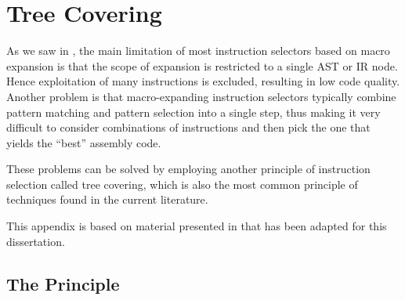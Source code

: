 %

\chapter{Tree Covering}


As we saw in , the main limitation of most
\glspl{instruction selector} based on \gls{macro expansion} is that the scope of
expansion is restricted to a single \gls{AST} or \gls{IR} \gls{node}.
%
Hence exploitation of
many \glspl{instruction} is excluded, resulting in low code quality.
%
Another
problem is that \gls{macro}-expanding \glspl{instruction selector} typically
combine \gls{pattern matching} and \gls{pattern selection} into a single step,
thus making it very difficult to consider combinations of \glspl{instruction}
and then pick the one that yields the ``best'' \gls{assembly code}.

These problems can be solved by employing another \gls{principle} of
\gls{instruction selection} called \gls{tree covering}, which is also the most
common \gls{principle} of techniques found in the current literature.

This appendix is based on material presented in
\cite[Chap.]{HjortBlindell:2016:Survey} that has been adapted for
this dissertation.


\section{The Principle}


